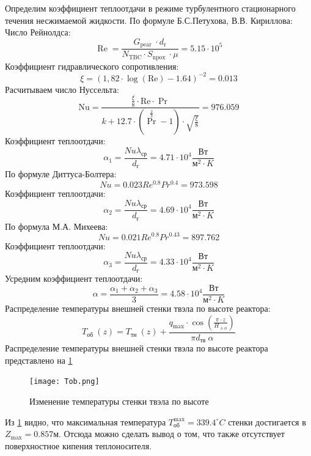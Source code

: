 Определим коэффициент теплоотдачи в режиме турбулентного
стационарного течения несжимаемой жидкости. По формуле Б.С.Петухова, В.В. Кириллова:
    Число Рейнолдса:
    $$
    \operatorname{Re}=\frac{G_{\text {pear }} \cdot d_{\mathrm{r}}}{N_{\mathrm{TBC}} \cdot S_{\text {npox }} \cdot \mu} = 5.15 \cdot 10^5
    $$
    Коэффициент гидравлического сопротивления:
    $$
    \xi=(1,82 \cdot \log (\mathrm{Re})-1.64)^{-2}= 0.013
    $$
    Расчитываем число Нуссельта:
    $$
    \mathrm{Nu}=\frac{\frac{\xi}{8} \cdot \mathrm{Re} \cdot \operatorname{Pr}}{k+12.7 \cdot\left(\operatorname{Pr}^{\frac{2}{3}}-1\right) \cdot \sqrt{\frac{\xi}{8}}} = 976.059 
    $$
    Коэффициент теплоотдачи:
    $$
    \alpha_1 = \frac {Nu \lambda_{\text{ср}}} {d_{\text{г}}} = 4.71 \cdot 10^4 \frac{\text{Вт}}{\text{м}^2 \cdot K}
    $$
    По формуле Диттуса-Болтера:
    $$
    Nu = 0.023Re^{0.8}Pr^{0.4} = 973.598
    $$
    Коэффициент теплоотдачи:
    $$
    \alpha_2 = \frac {Nu \lambda_{\text{ср}}} {d_{\text{г}}} = 4.69 \cdot 10^4 \frac{\text{Вт}}{\text{м}^2 \cdot K}
    $$
    По формула М.А. Михеева:
    $$
    Nu = 0.021Re^{0.8}Pr^{0.43} = 897.762
    $$
    Коэффициент теплоотдачи:
    $$
    \alpha_3 = \frac {Nu \lambda_{\text{ср}}} {d_{\text{г}}} = 4.33 \cdot 10^4 \frac{\text{Вт}}{\text{м}^2 \cdot K}
    $$
    Усредним коэффициент теплоотдачи:
    $$
    \alpha = \frac {\alpha_1 + \alpha_2 + \alpha_3} {3} = 4.58 \cdot 10^4 \frac{\text{Вт}}{\text{м}^2 \cdot K}
    $$
    Распределение температуры внешней стенки твэла по высоте реактора:
    $$
    T_{\text {об }}(z)=T_{\text {тн }}(z)+\frac{q_{\max } \cdot \cos \left(\frac{\pi \cdot z}{H_{\ni \phi}}\right)}{\pi d_{\text {тв }} \alpha}
    $$
Распределение температуры внешней стенки
твэла по высоте реактора представлено на \ref{pic:Tob}

\begin{figure}[H]
	\begin{center}
		\texttt{[image: Tob.png]}
		\caption{Изменение температуры стенки твэла по высоте}
		\label{pic:Tob} %
	\end{center}
\end{figure}

 Из \ref{pic:Tob} видно, что максимальная температура $T_{\text{об}}^{\max} = 339.4 ^\circ C $ стенки достигается в $Z_{\max} = 0.857 м$. Отсюда можно сделать вывод о том, что также отсутствует поверхностное кипения теплоносителя.

